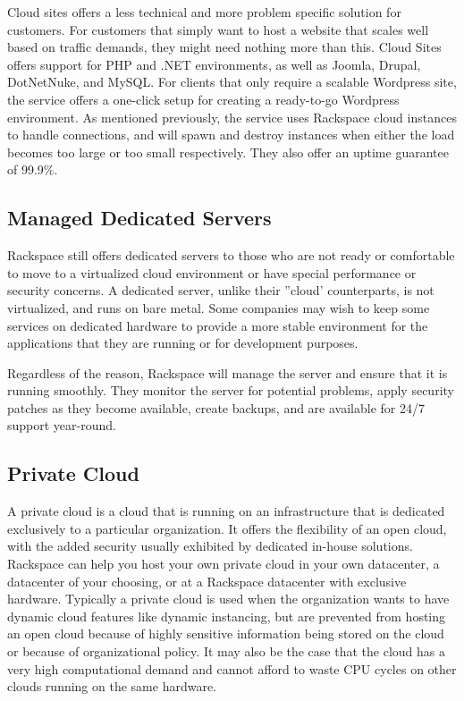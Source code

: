 \documentclass[DIV=calc, paper=letter, fontsize=12pt, twocolumn]{scrartcl}	 %
\begin{document}
Cloud sites offers a less technical and more problem specific solution for customers.
For customers that simply want to host a website that scales well based on
traffic demands, they might need nothing more than this. Cloud Sites offers
support for PHP and .NET environments, as well as Joomla, Drupal, DotNetNuke,
and MySQL. For clients that only require a scalable Wordpress site, the service
offers a one-click setup for creating a ready-to-go Wordpress environment. As 
mentioned previously, the service uses Rackspace cloud instances to handle 
connections, and will spawn and destroy instances when either the load becomes
too large or too small respectively. They also offer an uptime guarantee of 
99.9\%.

\subsection*{Managed Dedicated Servers}

Rackspace still offers dedicated servers to those who are not ready or comfortable
to move to a virtualized cloud environment or have special performance or security
concerns. A dedicated server, unlike their ''cloud' counterparts, is not virtualized,
and runs on bare metal. Some companies may wish to keep some services on dedicated
hardware to provide a more stable environment for the applications that they
are running or for development purposes.

Regardless of the reason, Rackspace will manage the server and ensure that it is 
running smoothly. They monitor the server for potential problems, apply security
patches as they become available, create backups, and are available for 24/7
support year-round.

\subsection*{Private Cloud}

A private cloud is a cloud that is running on an infrastructure that is dedicated
exclusively to a particular organization. It offers the flexibility of an
open cloud, with the added security usually exhibited by dedicated in-house
solutions. Rackspace can help you host your own private cloud in your own datacenter,
a datacenter of your choosing, or at a Rackspace datacenter with exclusive hardware.
Typically a private cloud is used when the organization wants to have dynamic
cloud features like dynamic instancing, but are prevented from hosting an open
cloud because of highly sensitive information being stored on the cloud or
because of organizational policy. It may also be the case that the cloud has
a very high computational demand and cannot afford to waste CPU cycles on
other clouds running on the same hardware.
\end{document}
